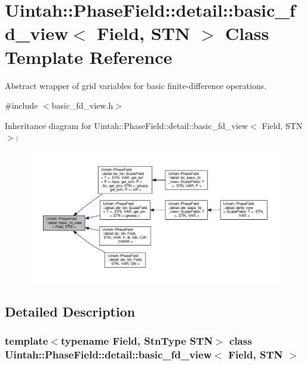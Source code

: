 \hypertarget{classUintah_1_1PhaseField_1_1detail_1_1basic__fd__view}{}\section{Uintah\+:\+:Phase\+Field\+:\+:detail\+:\+:basic\+\_\+fd\+\_\+view$<$ Field, S\+TN $>$ Class Template Reference}
\label{classUintah_1_1PhaseField_1_1detail_1_1basic__fd__view}


Abstract wrapper of grid variables for basic finite-\/difference operations.  




{\ttfamily \#include $<$basic\+\_\+fd\+\_\+view.\+h$>$}



Inheritance diagram for Uintah\+:\+:Phase\+Field\+:\+:detail\+:\+:basic\+\_\+fd\+\_\+view$<$ Field, S\+TN $>$\+:\nopagebreak
\begin{figure}[H]
\begin{center}
\leavevmode
\includegraphics[width=350pt]{classUintah_1_1PhaseField_1_1detail_1_1basic__fd__view__inherit__graph}
\end{center}
\end{figure}


\subsection{Detailed Description}
\subsubsection*{template$<$typename Field, Stn\+Type S\+TN$>$\newline
class Uintah\+::\+Phase\+Field\+::detail\+::basic\+\_\+fd\+\_\+view$<$ Field, S\+T\+N $>$}


